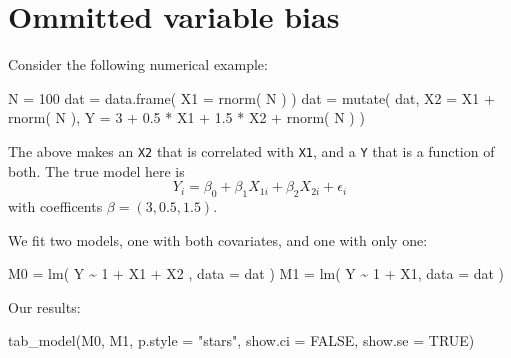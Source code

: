 \documentclass[
  letterpaper,
  DIV=11,
  numbers=noendperiod]{scrreprt}
\newenvironment{Shaded}{\begin{snugshade}}{\end{snugshade}}
\newcommand{\AttributeTok}[1]{\textcolor[rgb]{0.49,0.56,0.16}{#1}}
\newcommand{\ConstantTok}[1]{\textcolor[rgb]{0.53,0.00,0.00}{#1}}
\newcommand{\DecValTok}[1]{\textcolor[rgb]{0.25,0.63,0.44}{#1}}
\newcommand{\FloatTok}[1]{\textcolor[rgb]{0.25,0.63,0.44}{#1}}
\newcommand{\FunctionTok}[1]{\textcolor[rgb]{0.02,0.16,0.49}{#1}}
\newcommand{\NormalTok}[1]{\textcolor[rgb]{0.00,0.44,0.13}{#1}}
\newcommand{\OtherTok}[1]{\textcolor[rgb]{0.00,0.44,0.13}{#1}}
\newcommand{\SpecialCharTok}[1]{\textcolor[rgb]{0.25,0.44,0.63}{#1}}
\newcommand{\StringTok}[1]{\textcolor[rgb]{0.25,0.44,0.63}{#1}}
\begin{document}
\hypertarget{ommitted-variable-bias}{%
\section{Ommitted variable bias}\label{ommitted-variable-bias}}

Consider the following numerical example:

\begin{Shaded}
\begin{Highlighting}[]
\NormalTok{N }\OtherTok{=} \DecValTok{100}
\NormalTok{dat }\OtherTok{=} \FunctionTok{data.frame}\NormalTok{( }\AttributeTok{X1 =} \FunctionTok{rnorm}\NormalTok{( N ) )}
\NormalTok{dat }\OtherTok{=} \FunctionTok{mutate}\NormalTok{( dat, }
              \AttributeTok{X2 =}\NormalTok{ X1 }\SpecialCharTok{+} \FunctionTok{rnorm}\NormalTok{( N ),}
              \AttributeTok{Y =} \DecValTok{3} \SpecialCharTok{+} \FloatTok{0.5} \SpecialCharTok{*}\NormalTok{ X1 }\SpecialCharTok{+} \FloatTok{1.5} \SpecialCharTok{*}\NormalTok{ X2 }\SpecialCharTok{+} \FunctionTok{rnorm}\NormalTok{( N ) )}
\end{Highlighting}
\end{Shaded}

The above makes an \texttt{X2} that is correlated with \texttt{X1}, and
a \texttt{Y} that is a function of both. The true model here is
\[ Y_i = \beta_0 + \beta_1 X_{1i} + \beta_2 X_{2i} + \epsilon_{i} \]
with coefficents \(\beta = (3, 0.5, 1.5)\).

We fit two models, one with both covariates, and one with only one:

\begin{Shaded}
\begin{Highlighting}[]
\NormalTok{M0 }\OtherTok{=} \FunctionTok{lm}\NormalTok{( Y }\SpecialCharTok{\textasciitilde{}} \DecValTok{1} \SpecialCharTok{+}\NormalTok{ X1 }\SpecialCharTok{+}\NormalTok{ X2 , }\AttributeTok{data =}\NormalTok{ dat )}
\NormalTok{M1 }\OtherTok{=} \FunctionTok{lm}\NormalTok{( Y }\SpecialCharTok{\textasciitilde{}} \DecValTok{1} \SpecialCharTok{+}\NormalTok{ X1, }\AttributeTok{data =}\NormalTok{ dat )}
\end{Highlighting}
\end{Shaded}

Our results:

\begin{Shaded}
\begin{Highlighting}[]
\FunctionTok{tab\_model}\NormalTok{(M0, M1, }\AttributeTok{p.style =} \StringTok{"stars"}\NormalTok{,}
          \AttributeTok{show.ci =} \ConstantTok{FALSE}\NormalTok{, }\AttributeTok{show.se =} \ConstantTok{TRUE}\NormalTok{)}
\end{Highlighting}
\end{Shaded}
\end{document}
